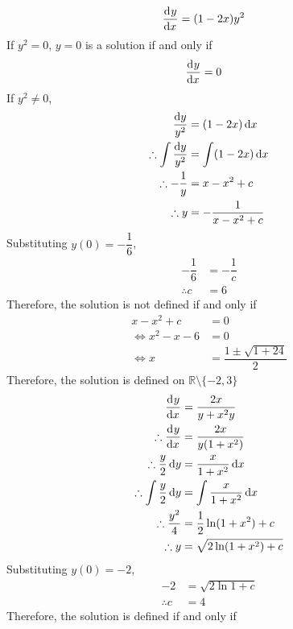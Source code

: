 \documentclass[fleqn, a4paper, 12pt, oneside]{amsart}
\theoremstyle{definition}
\theoremstyle{theorem}
\begin{document}
\begin{solution}
	\begin{tasks}
		\task
			\begin{align*}
				\dod{y}{x} &= (1 - 2x) y^2
			\end{align*}
			If $y^2 = 0$, 
			$y = 0$ is a solution if and only if
			\begin{align*}
				\dod{y}{x} &= 0
			\end{align*}
			If $y^2 \neq 0$,
			\begin{align*}
				\dfrac{\dif y}{y^2} &= (1- 2x) \dif x\\
				\therefore \int \dfrac{\dif y}{y^2} &= \int (1 - 2x) \dif x\\
				\therefore -\dfrac{1}{y} &= x - x^2 + c\\
				\therefore y &= -\dfrac{1}{x - x^2 + c}
			\end{align*}
			Substituting $y(0) = -\dfrac{1}{6}$,
			\begin{align*}
				-\dfrac{1}{6} &= -\dfrac{1}{c}\\
				\therefore c &= 6
			\end{align*}
			Therefore, the solution is not defined if and only if
			\begin{align*}
			 x - x^2 + c &= 0\\
			 \iff x^2 - x - 6 &= 0\\
			 \iff x &= \dfrac{1 \pm \sqrt{1 + 24}}{2}
			\end{align*}
			Therefore, the solution is defined on $\mathbb{R} \setminus \{-2, 3\}$
		\task 
			\begin{align*}
				\dod{y}{x} &= \dfrac{2x}{y + x^2 y}\\
				\therefore \dod{y}{x} &= \dfrac{2x}{y(1 + x^2)}\\
				\therefore \dfrac{y}{2} \dif y &= \dfrac{x}{1 + x^2} \dif x\\
				\therefore \int \dfrac{y}{2} \dif y &= \int \dfrac{x}{1 + x^2} \dif x\\
				\therefore \dfrac{y^2}{4} &= \dfrac{1}{2} \ln (1 + x^2) + c\\
				\therefore y &= \sqrt{2 \ln (1 + x^2) + c}
			\end{align*}
			Substituting $y(0) = -2$,
			\begin{align*}
				-2 &= \sqrt{2 \ln 1 + c}\\
				\therefore c &= 4
			\end{align*}
			Therefore, the solution is defined if and only if
			\begin{align*}

\end{align*}
\end{tasks}
\end{solution}
\end{document}
